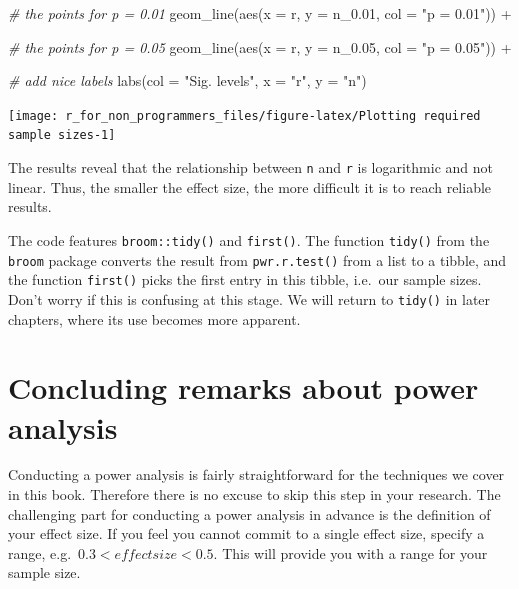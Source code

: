 \documentclass[
]{book}
\newenvironment{Shaded}{\begin{snugshade}}{\end{snugshade}}
\newcommand{\AttributeTok}[1]{\textcolor[rgb]{0.77,0.63,0.00}{#1}}
\newcommand{\CommentTok}[1]{\textcolor[rgb]{0.56,0.35,0.01}{\textit{#1}}}
\newcommand{\FloatTok}[1]{\textcolor[rgb]{0.00,0.00,0.81}{#1}}
\newcommand{\FunctionTok}[1]{\textcolor[rgb]{0.00,0.00,0.00}{#1}}
\newcommand{\NormalTok}[1]{#1}
\newcommand{\SpecialCharTok}[1]{\textcolor[rgb]{0.00,0.00,0.00}{#1}}
\newcommand{\StringTok}[1]{\textcolor[rgb]{0.31,0.60,0.02}{#1}}
\begin{document}
\begin{Shaded}
\begin{Highlighting}[]
  \CommentTok{\# the points for p = 0.01}
  \FunctionTok{geom\_line}\NormalTok{(}\FunctionTok{aes}\NormalTok{(}\AttributeTok{x =}\NormalTok{ r,}
                \AttributeTok{y =}\NormalTok{ n\_0}\FloatTok{.01}\NormalTok{,}
                \AttributeTok{col =} \StringTok{"p = 0.01"}\NormalTok{)) }\SpecialCharTok{+}
  
  \CommentTok{\# the points for p = 0.05}
  \FunctionTok{geom\_line}\NormalTok{(}\FunctionTok{aes}\NormalTok{(}\AttributeTok{x =}\NormalTok{ r,}
                \AttributeTok{y =}\NormalTok{ n\_0}\FloatTok{.05}\NormalTok{,}
                \AttributeTok{col =} \StringTok{"p = 0.05"}\NormalTok{)) }\SpecialCharTok{+}
  
  \CommentTok{\# add nice labels}
  \FunctionTok{labs}\NormalTok{(}\AttributeTok{col =} \StringTok{"Sig. levels"}\NormalTok{,}
       \AttributeTok{x =} \StringTok{"r"}\NormalTok{,}
       \AttributeTok{y =} \StringTok{"n"}\NormalTok{)}
\end{Highlighting}
\end{Shaded}

\begin{center}\texttt{[image: r\_for\_non\_programmers\_files/figure-latex/Plotting required sample sizes-1]} \end{center}

The results reveal that the relationship between \texttt{n} and \texttt{r} is logarithmic and not linear. Thus, the smaller the effect size, the more difficult it is to reach reliable results.

The code features \texttt{broom::tidy()} and \texttt{first()}. The function \texttt{tidy()} from the \texttt{broom} package converts the result from \texttt{pwr.r.test()} from a list to a tibble, and the function \texttt{first()} picks the first entry in this tibble, i.e.~our sample sizes. Don't worry if this is confusing at this stage. We will return to \texttt{tidy()} in later chapters, where its use becomes more apparent.

\hypertarget{concluding-remarks-about-power-analysis}{%
\section{Concluding remarks about power analysis}\label{concluding-remarks-about-power-analysis}}

Conducting a power analysis is fairly straightforward for the techniques we cover in this book. Therefore there is no excuse to skip this step in your research. The challenging part for conducting a power analysis in advance is the definition of your effect size. If you feel you cannot commit to a single effect size, specify a range, e.g.~\(0.3 < effect size < 0.5\). This will provide you with a range for your sample size.
\end{document}

